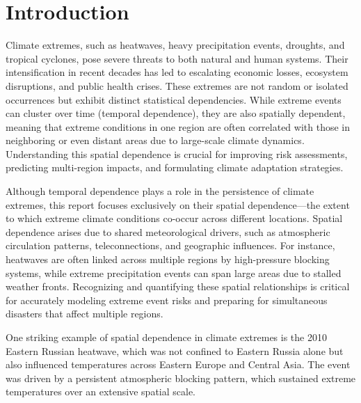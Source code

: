 \documentclass[
]{krantz}
\begin{document}
\section{Introduction}\label{introduction-2}

Climate extremes, such as heatwaves, heavy precipitation events, droughts, and tropical cyclones, pose severe threats to both natural and human systems. Their intensification in recent decades has led to escalating economic losses, ecosystem disruptions, and public health crises. These extremes are not random or isolated occurrences but exhibit distinct statistical dependencies. While extreme events can cluster over time (temporal dependence), they are also spatially dependent, meaning that extreme conditions in one region are often correlated with those in neighboring or even distant areas due to large-scale climate dynamics. Understanding this spatial dependence is crucial for improving risk assessments, predicting multi-region impacts, and formulating climate adaptation strategies.

Although temporal dependence plays a role in the persistence of climate extremes, this report focuses exclusively on their spatial dependence---the extent to which extreme climate conditions co-occur across different locations. Spatial dependence arises due to shared meteorological drivers, such as atmospheric circulation patterns, teleconnections, and geographic influences. For instance, heatwaves are often linked across multiple regions by high-pressure blocking systems, while extreme precipitation events can span large areas due to stalled weather fronts. Recognizing and quantifying these spatial relationships is critical for accurately modeling extreme event risks and preparing for simultaneous disasters that affect multiple regions.

One striking example of spatial dependence in climate extremes is the 2010 Eastern Russian heatwave, which was not confined to Eastern Russia alone but also influenced temperatures across Eastern Europe and Central Asia. The event was driven by a persistent atmospheric blocking pattern, which sustained extreme temperatures over an extensive spatial scale.
\end{document}
